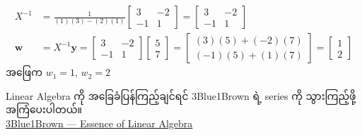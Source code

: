 \begin{align*}
X^{-1} &= \frac{1}{(1)(3) - (2)(1)} \begin{bmatrix} 3 & -2 \\ -1 & 1 \end{bmatrix} = \begin{bmatrix} 3 & -2 \\ -1 & 1 \end{bmatrix} \\[10pt]
\mathbf{w} &= X^{-1}\mathbf{y} = \begin{bmatrix} 3 & -2 \\ -1 & 1 \end{bmatrix} \begin{bmatrix} 5 \\ 7 \end{bmatrix} = \begin{bmatrix} (3)(5) + (-2)(7) \\ (-1)(5) + (1)(7) \end{bmatrix} = \begin{bmatrix} 1 \\ 2 \end{bmatrix}
\end{align*}
\noindent အဖြေက $w_1 = 1$, $w_2 = 2$

\begin{infobox}
Linear Algebra ကို အခြေခံပြန်ကြည့်ချင်ရင် 3Blue1Brown ရဲ့ series ကို သွားကြည့်ဖို့ အကြံပေးပါတယ်။ \\
\href{https://youtube.com/playlist?list=PLZHQObOWTQDPD3MizzM2xVFitgF8hE_ab&si=QxWZPVdOINlLmugE}{3Blue1Brown --- Essence of Linear Algebra}
\end{infobox}

